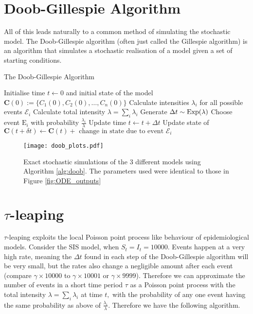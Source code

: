 \section{Doob-Gillespie Algorithm}

All of this leads naturally to a common method of simulating the stochastic model. The Doob-Gillespie algorithm (often just called the Gillespie algorithm) is an algorithm that simulates a stochastic realisation of a model given a set of starting conditions.

\begin{algorithm}
    \caption{The Doob-Gillespie Algorithm}\label{alg:doob}
    \begin{algorithmic}
        \State Initialise time $t \gets 0$ and initial state of the model $\mathbf{C}(0) := \{C_1(0), C_2(0), \dots, C_n(0)\}$
        \State Calculate intensities $\lambda_i$ for all possible events $\mathcal{E}_i$
        \State Calculate total intensity $\lambda = \sum_i \lambda_i$
        \State Generate $\Delta t \sim \operatorname{Exp}(\lambda)$
        \State Choose event $\mathrm{E}_i$ with probability $\frac{\lambda_i}{\lambda}$
        \State Update time $t \gets t + \Delta t$
        \State Update state of $\mathbf{C}(t + \delta t) \gets \mathbf{C}(t) + \text{ change in state due to event } \mathcal{E}_i$
        \EndWhile
    \end{algorithmic}
\end{algorithm}

\begin{figure}[htbp]
    \texttt{[image: doob\_plots.pdf]}
    \caption{Exact stochastic simulations of the 3 different models using Algorithm \ref{alg:doob}. The parameters used were identical to those in Figure \ref{fig:ODE_outputs}}\label{fig:doob_outputs}
\end{figure}

\section{\texorpdfstring{$\tau$}{Lg}-leaping}

$\tau$-leaping exploits the local Poisson point process like behaviour of epidemiological models. Consider the SIS model, when $S_t = I_t = 10000.$ Events happen at a very high rate, meaning the $\Delta t$ found in each step of the Doob-Gillespie algorithm will be very small, but the rates also change a negligible amount after each event (compare $\gamma\times 10000$ to $\gamma\times 10001$ or $\gamma\times 9999$). Therefore we can approximate the number of events in a short time period $\tau$ as a Poisson point process with the total intensity $\lambda = \sum_i \lambda_i$ at time $t,$ with the probability of any one event having the same probability as above of $\frac{\lambda_i}{\lambda}.$ Therefore we have the following algorithm.

